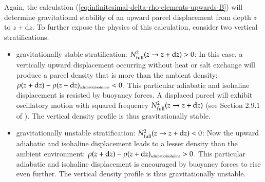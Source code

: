 Again, the calculation
(\ref{eq:infinitesimal-delta-rho-elements-upwards-B}) will determine
gravitational stability of an upward parcel displacement from depth
$z$ to $z+\mathrm{d}z$.  To further expose the physics of this
calculation, consider two vertical stratifications.
\begin{itemize}
\item {\sc gravitationally stable stratification:
    $N^{2}_{\mbox{\scriptsize full}}(z \rightarrow z+\mathrm{d}z) >
    0$}: In this case, a vertically upward displacement occurring
  without heat or salt exchange will produce a parcel density that is
  more than the ambient density: $\rho(z+\mathrm{d} z) -
  \rho(z+\mathrm{d} z)_{\mbox{\tiny adiabatic/isohaline}} <0$. This
  particular adiabatic and isohaline displacement is resisted by
  buoyancy forces.  A displaced parcel will exhibit oscillatory motion
  with squared frequency $N^{2}_{\mbox{\scriptsize full}}(z
  \rightarrow z+\mathrm{d}z)$ (see Section 2.9.1 of
  \cite{Vallis2006}).  The vertical density profile is thus
  gravitationally stable.

\item {\sc gravitationally unstable stratification:
    $N^{2}_{\mbox{\scriptsize full}}(z \rightarrow z+\mathrm{d}z) <
    0$}: Now the upward adiabatic and isohaline displacement leads to
  a lesser density than the ambient environment: $\rho(z+\mathrm{d} z)
  - \rho(z+\mathrm{d} z)_{\mbox{\tiny adiabatic/isohaline}} >0$.  This
  particular adiabatic and isohaline displacement is encouraged by
  buoyancy forces to rise even further. The vertical density profile
  is thus gravitationally unstable.

\end{itemize}

